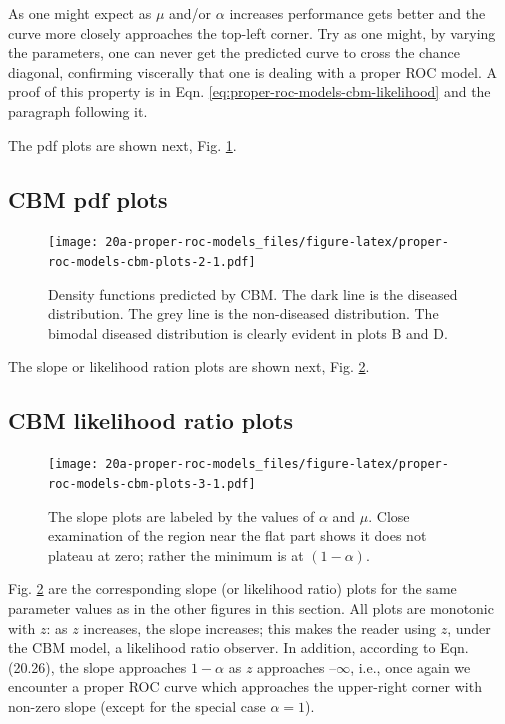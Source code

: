 \documentclass[
]{book}
\begin{document}
As one might expect as \(\mu\) and/or \(\alpha\) increases performance gets better and the curve more closely approaches the top-left corner. Try as one might, by varying the parameters, one can never get the predicted curve to cross the chance diagonal, confirming viscerally that one is dealing with a proper ROC model. A proof of this property is in Eqn. \eqref{eq:proper-roc-models-cbm-likelihood} and the paragraph following it.

The pdf plots are shown next, Fig. \ref{fig:proper-roc-models-cbm-plots-2}.

\hypertarget{proper-roc-models-cbm-pdfs}{%
\subsection{CBM pdf plots}\label{proper-roc-models-cbm-pdfs}}

\begin{figure}
\centering
\texttt{[image: 20a-proper-roc-models\_files/figure-latex/proper-roc-models-cbm-plots-2-1.pdf]}
\caption{\label{fig:proper-roc-models-cbm-plots-2}Density functions predicted by CBM. The dark line is the diseased distribution. The grey line is the non-diseased distribution. The bimodal diseased distribution is clearly evident in plots B and D.}
\end{figure}

The slope or likelihood ration plots are shown next, Fig. \ref{fig:proper-roc-models-cbm-plots-3}.

\hypertarget{proper-roc-models-cbm-slopes}{%
\subsection{CBM likelihood ratio plots}\label{proper-roc-models-cbm-slopes}}

\begin{figure}
\centering
\texttt{[image: 20a-proper-roc-models\_files/figure-latex/proper-roc-models-cbm-plots-3-1.pdf]}
\caption{\label{fig:proper-roc-models-cbm-plots-3}The slope plots are labeled by the values of \(\alpha\) and \(\mu\). Close examination of the region near the flat part shows it does not plateau at zero; rather the minimum is at \((1 - \alpha)\).}
\end{figure}

Fig. \ref{fig:proper-roc-models-cbm-plots-3} are the corresponding slope (or likelihood ratio) plots for the same parameter values as in the other figures in this section. All plots are monotonic with \(z\): as \(z\) increases, the slope increases; this makes the reader using \(z\), under the CBM model, a likelihood ratio observer. In addition, according to Eqn. (20.26), the slope approaches \(1-\alpha\) as \(z\) approaches \(–\infty\), i.e., once again we encounter a proper ROC curve which approaches the upper-right corner with non-zero slope (except for the special case \(\alpha = 1\)).
\end{document}
